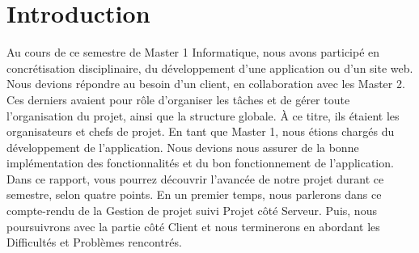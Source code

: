 \chapter{Introduction}

Au cours de ce semestre de Master 1 Informatique, nous avons participé en concrétisation disciplinaire, du développement d'une application ou d'un site web. Nous devions répondre au besoin d'un client, en collaboration avec les Master 2. Ces derniers avaient pour rôle d'organiser les tâches et de gérer toute l'organisation du projet, ainsi que la structure globale. À ce titre, ils étaient les organisateurs et chefs de projet.
En tant que Master 1, nous étions chargés du développement de l'application. Nous devions nous assurer de la bonne implémentation des fonctionnalités et du  bon fonctionnement de l'application.
Dans ce rapport, vous pourrez découvrir l'avancée de notre projet durant ce semestre, selon quatre points. En un premier temps, nous parlerons dans ce compte-rendu de la Gestion de projet suivi Projet côté Serveur. Puis, nous poursuivrons avec la partie côté Client et nous terminerons en abordant les Difficultés et Problèmes rencontrés.


